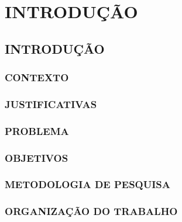 \part{INTRODUÇÃO}

\chapter[Introdução]{INTRODUÇÃO}



\section[Contexto]{CONTEXTO}

\section[Justificativas]{JUSTIFICATIVAS}

\section[Problema]{PROBLEMA}

\section[Objetivos]{OBJETIVOS}

\section[Metodologia de Pesquisa]{METODOLOGIA DE PESQUISA}

\section[Organização do Trabalho]{ORGANIZAÇÃO DO TRABALHO}